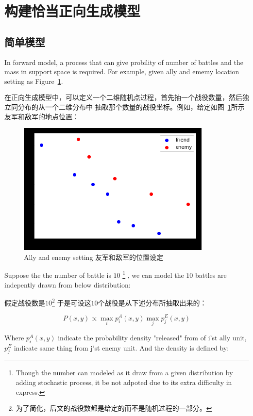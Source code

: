 \documentclass{article}
\begin{document}
\section{构建恰当正向生成模型}

\subsection{简单模型}

In forward model, a process that can give probility of number of battles and the mass in support space 
is required. For example, given ally and ememy location setting as Figure~\ref{fig:stateNoBattle}.

在正向生成模型中，可以定义一个二维随机点过程，首先抽一个战役数量，然后独立同分布的从一个二维分布中
抽取那个数量的战役坐标。例如，给定如图~\ref{fig:stateNoBattle}所示友军和敌军的地点位置：

\begin{figure}[ht]
\includegraphics{state_no_battle.png}
\caption{Ally and enemy setting
友军和敌军的位置设定}
\label{fig:stateNoBattle}
\end{figure}


Suppose the the number of battle is $10$ 
\footnote{ Though the number can modeled as it draw from a given distribution by adding 
stochastic process, it be not adpoted due to its extra difficulty in express.}
, we can model the $10$ battles are indepently drawn from below distribution:

假定战役数是$10$\footnote{为了简化，后文的战役数都是给定的而不是随机过程的一部分。}
于是可设这$10$个战役是从下述分布所抽取出来的：

$$
P(x,y) \propto \max_i p^A_{i}(x,y) \max_j p^E_{j} (x,y)
$$

Where $p^A_{i}(x,y)$ indicate the probability density "released" from of i’st ally unit,
$p^E_{j}$ indicate same thing from j’st enemy unit. And the density is defined by:
\end{document}
